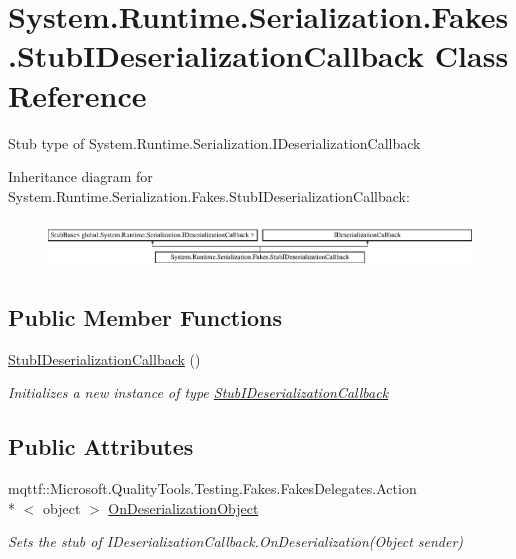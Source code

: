 \hypertarget{class_system_1_1_runtime_1_1_serialization_1_1_fakes_1_1_stub_i_deserialization_callback}{\section{System.\-Runtime.\-Serialization.\-Fakes.\-Stub\-I\-Deserialization\-Callback Class Reference}
\label{class_system_1_1_runtime_1_1_serialization_1_1_fakes_1_1_stub_i_deserialization_callback}
}


Stub type of System.\-Runtime.\-Serialization.\-I\-Deserialization\-Callback 


Inheritance diagram for System.\-Runtime.\-Serialization.\-Fakes.\-Stub\-I\-Deserialization\-Callback\-:\begin{figure}[H]
\begin{center}
\leavevmode
\includegraphics[height=1.287356cm]{class_system_1_1_runtime_1_1_serialization_1_1_fakes_1_1_stub_i_deserialization_callback}
\end{center}
\end{figure}
\subsection*{Public Member Functions}
\begin{DoxyCompactItemize}
\item 
\hyperlink{class_system_1_1_runtime_1_1_serialization_1_1_fakes_1_1_stub_i_deserialization_callback_a3c27754dd4db56f6f0b04a3f458287fc}{Stub\-I\-Deserialization\-Callback} ()
\begin{DoxyCompactList}\small\item\em Initializes a new instance of type \hyperlink{class_system_1_1_runtime_1_1_serialization_1_1_fakes_1_1_stub_i_deserialization_callback}{Stub\-I\-Deserialization\-Callback}\end{DoxyCompactList}\end{DoxyCompactItemize}
\subsection*{Public Attributes}
\begin{DoxyCompactItemize}
\item 
mqttf\-::\-Microsoft.\-Quality\-Tools.\-Testing.\-Fakes.\-Fakes\-Delegates.\-Action\\*
$<$ object $>$ \hyperlink{class_system_1_1_runtime_1_1_serialization_1_1_fakes_1_1_stub_i_deserialization_callback_a0876c17b5a8e8ce1c31f10f903833c1d}{On\-Deserialization\-Object}
\begin{DoxyCompactList}\small\item\em Sets the stub of I\-Deserialization\-Callback.\-On\-Deserialization(\-Object sender)\end{DoxyCompactList}\end{DoxyCompactItemize}


